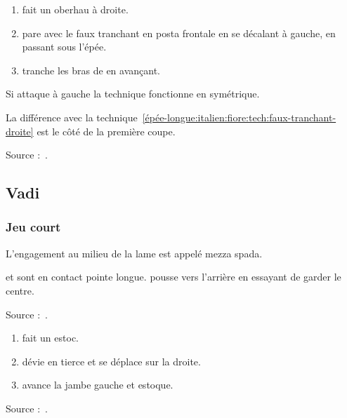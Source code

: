 \begin{technique}
\label{épée-longue:italien:fiore:tech:posta-frontale-faux-tranchant}

\begin{enumerate}
	\item \A fait un oberhau à droite.
	\item \D pare avec le faux tranchant en posta frontale en se décalant à gauche, en passant sous l'épée.
	\item \D tranche les bras de \A en avançant.
\end{enumerate}

Si \A attaque à gauche la technique fonctionne en symétrique.

La différence avec la technique~\ref{épée-longue:italien:fiore:tech:faux-tranchant-droite} est le côté de la première coupe.

Source :~\cite{campo:dijon:posta_frontale:2015}.

\end{technique}


\subsection{Vadi}


\subsubsection{Jeu court}




\begin{definition}

L'engagement au milieu de la lame est appelé mezza spada.

\end{definition}



\begin{exercice}
\A et \D sont en contact pointe longue.
\A pousse \D vers l'arrière en essayant de garder le centre.

Source :~\cite{petit:dijon:close_longword:2015}.
\end{exercice}


\begin{technique}

\begin{enumerate}
	\item \A fait un estoc.
	\item \D dévie en tierce et se déplace sur la droite.
	\item \D avance la jambe gauche et estoque.
\end{enumerate}

Source :~\cite{petit:dijon:close_longword:2015}.

\end{technique}


